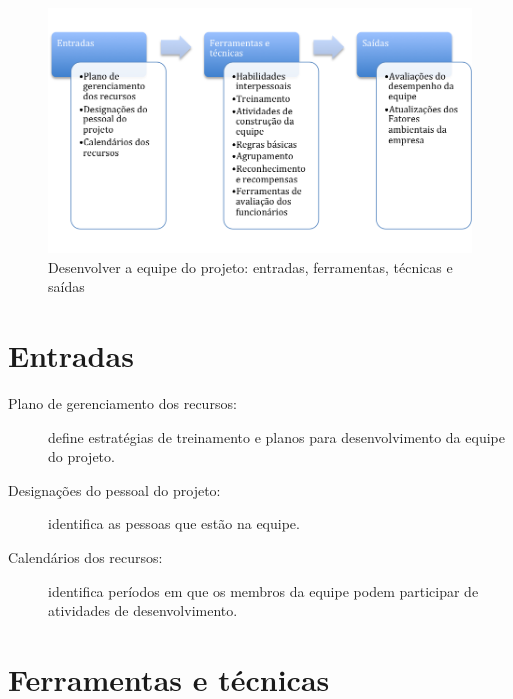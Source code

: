 \begin{figure}[!h]
	\centering
	\includegraphics[scale=0.5]{Figuras/rh_efts_desenvolver.png}
	\caption{Desenvolver a equipe do projeto: entradas, ferramentas, técnicas e saídas}
	\label{fig:rh:desenv:efts}
\end{figure}

\section{Entradas}

\begin{description}

	\item[Plano de gerenciamento dos recursos:] define estratégias de treinamento e planos para desenvolvimento da equipe do projeto.
	
	\item[Designações do pessoal do projeto:] identifica as pessoas que estão na equipe.
	
	\item[Calendários dos recursos:] identifica períodos em que os membros da equipe podem participar de atividades de desenvolvimento.
	
	
\end{description}

\section{Ferramentas e técnicas}

